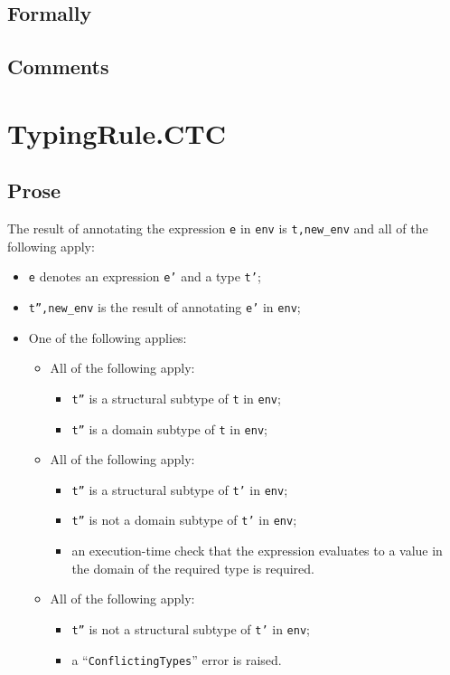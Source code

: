 \documentclass{book}
\begin{document}
  \subsection{Formally}
       
  \subsection{Comments}

\section{TypingRule.CTC \label{sec:TypingRule.CTC}}

  \subsection{Prose}
  The result of annotating the expression \texttt{e} in \texttt{env} is
\texttt{t,new\_env} and all of the following apply:
  \begin{itemize}
  \item \texttt{e} denotes an expression \texttt{e'} and a type \texttt{t'};
  \item \texttt{t'',new\_env} is the result of annotating \texttt{e'} in \texttt{env};
  \item One of the following applies:
    \begin{itemize}
    \item All of the following apply:
      \begin{itemize}
      \item \texttt{t''} is a structural subtype of \texttt{t} in \texttt{env};
      \item \texttt{t''} is a domain subtype of \texttt{t} in \texttt{env};
      \end{itemize}
    \item All of the following apply:
      \begin{itemize}
      \item \texttt{t''} is a structural subtype of \texttt{t'} in \texttt{env};
      \item \texttt{t''} is not a domain subtype of \texttt{t'} in \texttt{env};
      \item an execution-time check that the expression evaluates to a value in the
        domain of the required type is required.
      \end{itemize}
   \item All of the following apply:
     \begin{itemize}
     \item \texttt{t''} is not a structural subtype of \texttt{t'} in \texttt{env};
     \item a ``\texttt{ConflictingTypes}'' error is raised.
     \end{itemize}
   \end{itemize}
  \end{itemize}
\end{document}

